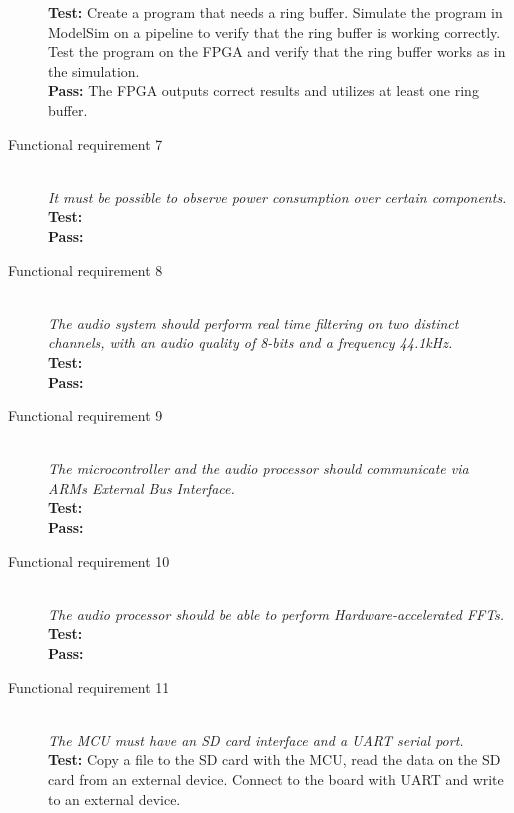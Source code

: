 \begin{description}
        \textbf{Test:} Create a program that needs a ring buffer. 
        Simulate the program in ModelSim on a pipeline to verify that
        the ring buffer is working correctly.
        Test the program on the FPGA and verify that the ring buffer
        works as in the simulation. \\
        \textbf{Pass:} The FPGA outputs correct results and utilizes at least one ring buffer.\\
    \item[Functional requirement 7] \hfill \\
        \textit{It must be possible to observe power consumption over certain components.} \\
        \textbf{Test:} \\
        \textbf{Pass:} \\
    \item[Functional requirement 8] \hfill \\
        \textit{The audio system should perform real time filtering on
        two distinct channels, with an audio quality of 8-bits and a frequency 44.1kHz.} \\
        \textbf{Test:} \\
        \textbf{Pass:} \\
    \item[Functional requirement 9] \hfill \\
        \textit{The microcontroller and the audio processor should communicate via ARMs
        External Bus Interface.} \\
        \textbf{Test:} \\
        \textbf{Pass:} \\
    \item[Functional requirement 10] \hfill \\
        \textit{The audio processor should be able to perform Hardware-accelerated FFTs.} \\
        \textbf{Test:} \\
        \textbf{Pass:} \\
    \item[Functional requirement 11] \hfill \\
        \textit{The MCU must have an SD card interface and a UART serial port.} \\
        \textbf{Test:} Copy a file to the SD card with the MCU, read the data on the SD card
        from an external device. Connect to the board with UART and write to an external device.\\

\end{description}
